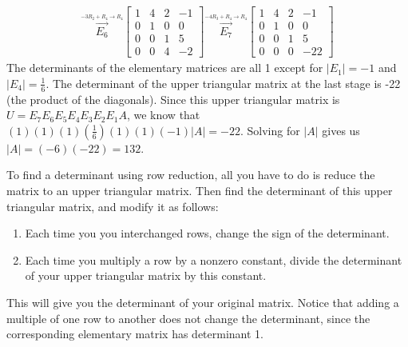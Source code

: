 \begin{example}
\begin{align*}
\\
\stackrel{\xrightarrow{-3R_2+R_4\to R_4}}{E_6}
\begin{bmatrix}
 1 & 4 & 2 & -1\\
 0 & 1 & 0 & 0 \\
 0 & 0 & 1 & 5 \\
 0 & 0 & 4 & -2 
\end{bmatrix}
\stackrel{\xrightarrow{-4R_3+R_4\to R_4}}{E_7}
\begin{bmatrix}
 1 & 4 & 2 & -1\\
 0 & 1 & 0 & 0 \\
 0 & 0 & 1 & 5 \\
 0 & 0 & 0 & -22 
\end{bmatrix}
\end{align*}
The determinants of the elementary matrices are all 1 except for $|E_1|=-1$ and $|E_4|=\frac{1}{6}$.  
The determinant of the upper triangular matrix at the last stage is -22 (the product of the diagonals).    
Since this upper triangular matrix is  $U=E_7E_6E_5E_4E_3E_2E_1A$, we know that $(1)(1)(1)(\frac{1}{6})(1)(1)(-1)|A|=-22$. Solving for $|A|$ gives us $|A|=(-6)(-22)=132$. 

\end{example}

To find a determinant using row reduction, all you have to do is reduce the matrix to an upper triangular matrix. Then find the determinant of this upper triangular matrix, and modify it as follows: 
\begin{enumerate}
	\item Each time you you interchanged rows, change the sign of the determinant. 
	\item Each time you  multiply a row by a nonzero constant, divide the determinant of your upper triangular matrix by this constant.  
\end{enumerate}
This will give you the determinant of your original matrix.  Notice that adding a multiple of one row to another does not change the determinant, since the corresponding elementary matrix has determinant 1.




